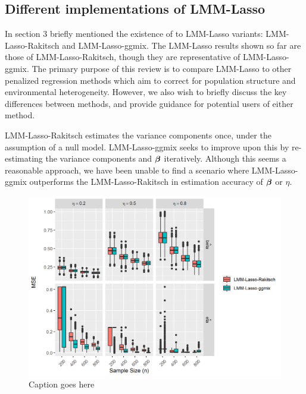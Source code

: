 \subsection{Different implementations of LMM-Lasso}

In section 3 briefly mentioned the existence of to LMM-Lasso variants: LMM-Lasso-Rakitsch and LMM-Lasso-ggmix. The LMM-Lasso results shown so far are those of LMM-Lasso-Rakitsch, though they are representative of LMM-Lasso-ggmix. The primary purpose of this review is to compare LMM-Lasso to other penalized regression methods which aim to correct for population structure and environmental heterogeneity. However, we also wish to briefly discuss the key differences between methods, and provide guidance for potential users of either method. 

LMM-Lasso-Rakitsch estimates the variance components once, under the assumption of a null model. LMM-Lasso-ggmix seeks to improve upon this by re-estimating the variance components and $\boldsymbol{\beta}$ iteratively. Although this seems a reasonable approach, we have been unable to find a scenario where LMM-Lasso-ggmix outperforms the LMM-Lasso-Rakitsch in estimation accuracy of $\boldsymbol{\beta}$ or $\eta$. 

\begin{figure}[H]
    \centering
    \includegraphics[scale = 1]{figures/eta_beta_hat.png}
     \caption{Caption goes here }
    \label{fig:eta_beta_mse}
\end{figure}


